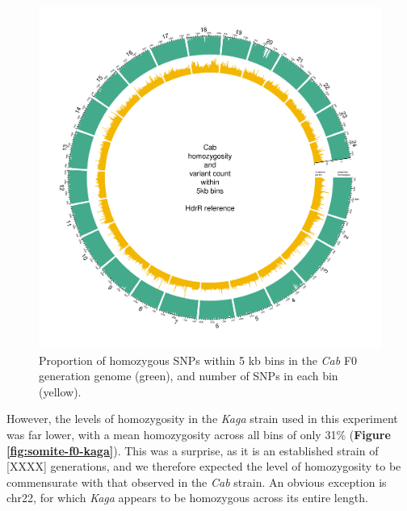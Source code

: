 \documentclass[
]{book}
\begin{document}
\begin{figure}
\includegraphics[width=1\linewidth]{figs/somites/Cab} \caption{Proportion of homozygous SNPs within 5 kb bins in the \emph{Cab} F0 generation genome (green), and number of SNPs in each bin (yellow).}\label{fig:somite-f0-cab}
\end{figure}

\clearpage

However, the levels of homozygosity in the \emph{Kaga} strain used in this experiment was far lower, with a mean homozygosity across all bins of only 31\% (\textbf{Figure \ref{fig:somite-f0-kaga}}). This was a surprise, as it is an established strain of {[}XXXX{]} generations, and we therefore expected the level of homozygosity to be commensurate with that observed in the \emph{Cab} strain. An obvious exception is chr22, for which \emph{Kaga} appears to be homozygous across its entire length.
\end{document}
